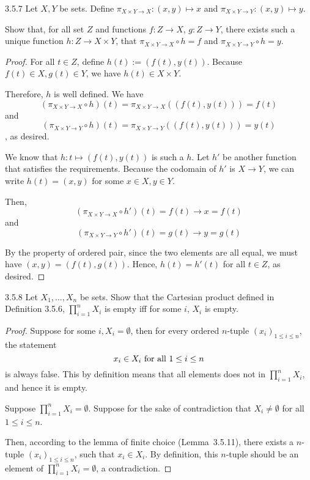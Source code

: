 \begin{exercise}{3.5.7}
	Let $X,Y$ be sets. Define $\pi_{X\times Y \to X}: (x,y) \mapsto x$ and $\pi_{X\times Y \to Y}: (x,y) \mapsto y$.
	
	Show that, for all set $Z$ and functions $f: Z \to X$, $g: Z \to Y$, there exists such a unique function $h: Z \to X \times Y$, that $\pi_{X\times Y \to X} \circ h = f$ and $\pi_{X\times Y \to Y} \circ h = y$.
\end{exercise}
\begin{proof}
	 For all $t \in Z$, define $h(t) := (f(t),y(t))$. Because $f(t) \in X, g(t) \in Y$, we have $h(t) \in X \times Y$.
	
	Therefore, $h$ is well defined. We have
	\[
	(\pi_{X\times Y \to X} \circ h)(t) = \pi_{X\times Y \to X}((f(t),y(t))) = f(t)
	\]
	and
	\[
	(\pi_{X\times Y \to Y} \circ h)(t) = \pi_{X\times Y \to Y}((f(t),y(t))) = y(t)
	\]
	, as desired.

	 We know that $h: t \mapsto (f(t),y(t))$ is such a $h$. Let $h'$ be another function that satisfies the requirements. Because the codomain of $h'$ is $X \to Y$, we can write $h(t) = (x,y)$ for some $x \in X, y \in Y$.
	
	Then,
	\[
		(\pi_{X\times Y \to X} \circ h')(t) = f(t) \to x = f(t)
	\]
	and
	\[
		(\pi_{X\times Y \to Y} \circ h')(t) = g(t) \to y = g(t)
	\]
	
	By the property of ordered pair, since the two elements are all equal, we must have $(x,y) = (f(t),g(t))$. Hence, $h(t) = h'(t)$ for all $t \in Z$, as desired.
\end{proof}

\begin{exercise}{3.5.8}
	Let $X_1, \dots, X_n$ be sets. Show that the Cartesian product defined in Definition 3.5.6, $\prod_{i=1}^{n}X_i$ is empty iff for some $i$, $X_i$ is empty.
\end{exercise}
\begin{proof}
\myifbox Suppose for some $i, X_i = \emptyset$, then for every ordered $n$-tuple $(x_i)_{1 \le i \le n}$, the statement 
\[
x_i \in X_i \hbox{ for all } 1 \le i \le n
\]
is always false. This by definition means that all elements does not in $\prod_{i=1}^{n}X_i$, and hence it is empty.

\myoifbox Suppose $\prod_{i=1}^{n}X_i = \emptyset$. Suppose for the sake of contradiction that $X_i \ne \emptyset$ for all $1 \le i \le n$. 

Then, according to the lemma of finite choice (Lemma~3.5.11), there exists a $n$-tuple $(x_i)_{1 \le i \le n}$, such that $x_i \in X_i$. By definition, this $n$-tuple should be an element of $\prod_{i=1}^{n}X_i = \emptyset$, a contradiction.
\end{proof}

